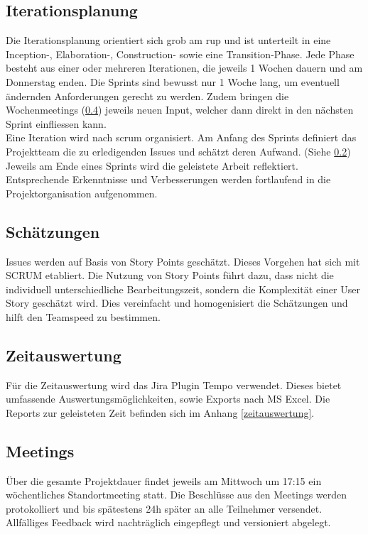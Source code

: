 \documentclass[11pt,a4paper,english,oneside]{book}
\numberwithin{equation}{chapter}
\begin{document}
	
	\subsection{Iterationsplanung}
	Die Iterationsplanung orientiert sich grob am \gls{rup} und ist unterteilt in eine Inception-, Elaboration-, Construction- sowie eine Transition-Phase. Jede Phase besteht aus einer oder mehreren Iterationen, die jeweils 1 Wochen dauern und am Donnerstag enden. Die Sprints sind bewusst nur 1 Woche lang, um eventuell ändernden Anforderungen gerecht zu werden. Zudem bringen die Wochenmeetings (\ref{ssec:meeting}) jeweils neuen Input, welcher dann direkt in den nächsten Sprint einfliessen kann.\\
	Eine Iteration wird nach \gls{scrum} organisiert. Am Anfang des Sprints definiert das Projektteam die zu erledigenden Issues und schätzt deren Aufwand. (Siehe \ref{sec:estimations}) Jeweils am Ende eines Sprints wird die geleistete Arbeit reflektiert. Entsprechende Erkenntnisse und Verbesserungen werden fortlaufend in die Projektorganisation aufgenommen. 
		
	\subsection{Schätzungen}
	\label{sec:estimations}
	Issues werden auf Basis von Story Points geschätzt. Dieses Vorgehen hat sich mit SCRUM etabliert. Die Nutzung von Story Points führt dazu, dass nicht die individuell unterschiedliche Bearbeitungszeit, sondern die Komplexität einer User Story geschätzt wird. Dies vereinfacht  und homogenisiert die Schätzungen und hilft den Teamspeed zu bestimmen.\cite{storypoints, storypoints2}
	
	\subsection{Zeitauswertung}
	Für die Zeitauswertung wird das Jira Plugin Tempo \cite{jiratempo} verwendet. Dieses bietet umfassende Auswertungsmöglichkeiten, sowie Exports nach MS Excel. Die Reports zur geleisteten Zeit befinden sich im Anhang \ref{zeitauswertung}.
	
	\subsection{Meetings} \label{ssec:meeting}
	Über die gesamte Projektdauer findet jeweils am Mittwoch um 17:15 ein wöchentliches Standortmeeting statt. Die Beschlüsse aus den Meetings werden protokolliert und bis spätestens 24h später an alle Teilnehmer versendet. Allfälliges Feedback wird nachträglich eingepflegt und versioniert abgelegt.
	
\end{document}
